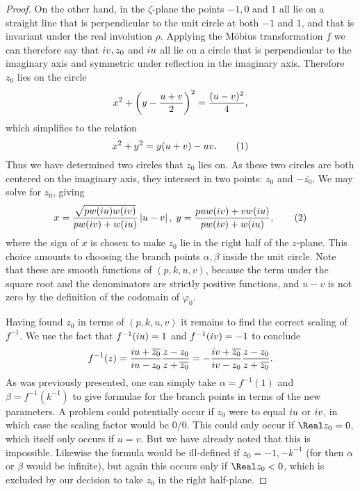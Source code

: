 \begin{lem}
\begin{proof}
On the other hand, in the $ζ$-plane the points $-1,0$ and $1$ all lie on a straight line that is perpendicular to the unit circle at both $-1$ and $1$, and that is invariant under the real involution $ρ$. Applying the M\"obius transformation $f$ we can therefore say that $i v, z_0$ and $i u$ all lie on a circle that is perpendicular to the imaginary axis and symmetric under reflection in the imaginary axis. Therefore $z_0$ lies on the circle
\[
x^2 + \left( y - \frac{u+v}{2} \right)^2 = \frac{(u-v)^2}{4},
\]
which simplifies to the relation
\[
x^2 + y^2 = y(u+v) - uv. \labelthis{eqn:z_0_circle}
\]
Thus we have determined two circles that $z_0$ lies on. As these two circles are both centered on the imaginary axis, they intersect in two points: $z_0$ and $-\bar{z_0}$. We may solve for $z_0$, giving
\[
x = \frac{\sqrt{pw(\iu u)w(\iu v)}}{pw(\iu v) + w(\iu u)} \abs{u-v},\; y = \frac{puw(\iu v) + vw(\iu u)}{pw(\iu v) + w(\iu u)},
\labelthis{eqn:formula xy}
\]
where the sign of $x$ is chosen to make $z_0$ lie in the right half of the $z$-plane. This choice amounts to choosing the branch points $α,β$ inside the unit circle. Note that these are smooth functions of $(p,k,u,v)$, because the term under the square root and the denominators are strictly positive functions, and $u-v$ is not zero by the definition of the codomain of $φ_0$.

Having found $z_0$ in terms of $(p,k,u,v)$ it remains to find the correct scaling of $f^{-1}$. We use the fact that $f^{-1}(i u) = 1$ and $f^{-1}(i v) = -1$ to conclude
\[
f^{-1}(z)
=  \frac{i u + \overline{z_0}}{i u - z_0} \frac{z-z_0}{z + \overline{z_0}}
=  -\frac{i v + \overline{z_0}}{i v - z_0} \frac{z-z_0}{z + \overline{z_0}}.
\]
As was previously presented, one can simply take $α = f^{-1}(1)$ and $β = f^{-1}(k^{-1})$ to give formulae for the branch points in terms of the new parameters. A problem could potentially occur if $z_0$ were to equal $i u$ or $i v$, in which case the scaling factor would be $0/0$. This could only occur if $\Real z_0 = 0$, which itself only occurs if $u=v$. But we have already noted that this is impossible. Likewise the formula would be ill-defined if $z_0 = -1, -k^{-1}$ (for then $α$ or $β$ would be infinite), but again this occurs only if $\Real z_0 < 0$, which is excluded by our decision to take $z_0$ in the right half-plane.


\end{proof}
\end{lem}
